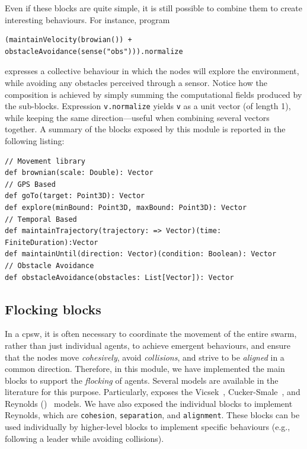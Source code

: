 Even if these blocks are quite simple, 
 it is still possible to combine them to create interesting behaviours. 
For instance, program 
\begin{lstlisting}
(maintainVelocity(browian()) + obstacleAvoidance(sense("obs"))).normalize
\end{lstlisting}
expresses a collective behaviour in which the nodes will explore the environment,
 while avoiding any obstacles perceived through a sensor. 
Notice how the composition is achieved by simply summing the computational fields produced by the sub-blocks.
%
Expression \lstinline|v.normalize| yields \lstinline|v| as a unit vector (of length 1), while keeping the same direction---useful when combining several vectors together.
%
A summary of the blocks exposed by this module is reported in the following listing:
\begin{lstlisting}
// Movement library
def brownian(scale: Double): Vector
// GPS Based
def goTo(target: Point3D): Vector
def explore(minBound: Point3D, maxBound: Point3D): Vector
// Temporal Based
def maintainTrajectory(trajectory: => Vector)(time: FiniteDuration):Vector
def maintainUntil(direction: Vector)(condition: Boolean): Vector
// Obstacle Avoidance
def obstacleAvoidance(obstacles: List[Vector]): Vector
\end{lstlisting}

\subsection{Flocking blocks}\label{coordination2023-macro:subsec:flockig} 
In a \ac{cpsw}, 
 it is often necessary to coordinate the movement of the entire swarm, 
 rather than just individual agents, to achieve emergent behaviours,
 and ensure that the nodes move \emph{cohesively}, avoid \emph{collisions}, 
 and strive to be \emph{aligned} in a common direction. 
% 
Therefore, in this module, 
 we have implemented the main blocks to support the \emph{flocking} of agents. 
% 
Several models are available in the literature for this purpose.
 Particularly, \MacroSwarm{} exposes 
 the Vicsek~\cite{VicsekModeling1995}, 
 Cucker-Smale~\cite{CuckerSmaleModeling2007}, 
 and Reynolds ()~\cite{DBLP:conf/siggraph/Reynolds87} models. 
% 
% 
We have also exposed the individual blocks to implement Reynolds, 
 which are \lstinline|cohesion|, \lstinline|separation|, and \lstinline|alignment|. 
% 
These blocks can be used individually by higher-level blocks to implement specific behaviours 
 (e.g., following a leader while avoiding collisions). 

